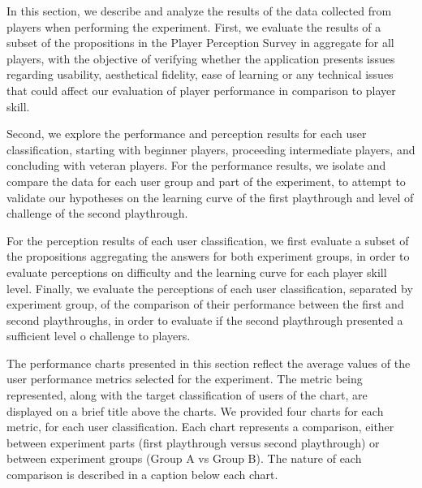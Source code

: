 In this section, we describe and analyze the results of the data collected from players when performing the experiment. First, we evaluate the results of a subset of the propositions in the Player Perception Survey in aggregate for all players, with the objective of verifying whether the application presents issues regarding usability, aesthetical fidelity, ease of learning or any technical issues that could affect our evaluation of player performance in comparison to player skill.

Second, we explore the performance and perception results for each user classification, starting with beginner players, proceeding intermediate players, and concluding with veteran players. For the performance results, we isolate and compare the data for each user group and part of the experiment, to attempt to validate our hypotheses on the learning curve of the first playthrough and level of challenge of the second playthrough.

For the perception results of each user classification, we first evaluate a subset of the propositions aggregating the answers for both experiment groups, in order to evaluate perceptions on difficulty and the learning curve for each player skill level. Finally, we evaluate the perceptions of each user classification, separated by experiment group, of the comparison of their performance between the first and second playthroughs, in order to evaluate if the second playthrough presented a sufficient level o challenge to players.

The performance charts presented in this section reflect the average values of the user performance metrics selected for the experiment. The metric being represented, along with the target classification of users of the chart, are displayed on a brief title above the charts. We provided four charts for each metric, for each user classification. Each chart represents a comparison, either between experiment parts (first playthrough versus second playthrough) or between experiment groups (Group A vs Group B). The nature of each comparison is described in a caption below each chart.

